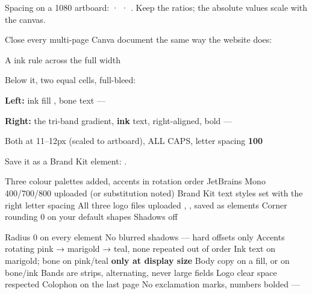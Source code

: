 \documentclass[fontpath=fonts/,logopath=logo/]{riposte-doc}
\begin{document}
Spacing on a 1080 artboard:  ·  · . Keep the ratios; the absolute values scale with the canvas.



Close every multi-page Canva document the same way the website does:

\begin{ripnumbers}
\item A \ripmono{2px} ink rule across the full width
\item Below it, two equal cells, full-bleed:
\begin{ripbullets}
\item \textbf{Left:} ink fill , bone text — 
\item \textbf{Right:} the tri-band gradient, \textbf{ink} text, right-aligned, bold — 
\end{ripbullets}

\item Both at 11–12px (scaled to artboard), ALL CAPS, letter spacing \textbf{100}
\end{ripnumbers}

Save it as a Brand Kit element: .



\begin{riptodolist}
\riptodo Three colour palettes added, accents in rotation order
\riptodo JetBrains Mono 400/700/800 uploaded (or substitution noted)
\riptodo Brand Kit text styles set with the right letter spacing
\riptodo All three logo files uploaded
\riptodo {}, ,  saved as elements
\riptodo Corner rounding 0 on your default shapes
\riptodo Shadows off
\end{riptodolist}



\begin{riptodolist}
\riptodo Radius 0 on every element
\riptodo No blurred shadows — hard offsets only
\riptodo Accents rotating pink → marigold → teal, none repeated out of order
\riptodo Ink text on marigold; bone on pink/teal \textbf{only at display size}
\riptodo Body copy on a  fill, or on bone/ink
\riptodo Bands are strips, alternating, never large fields
\riptodo Logo clear space respected
\riptodo Colophon on the last page
\riptodo No exclamation marks, numbers bolded — 
\end{riptodolist}

\ripend
\end{document}
